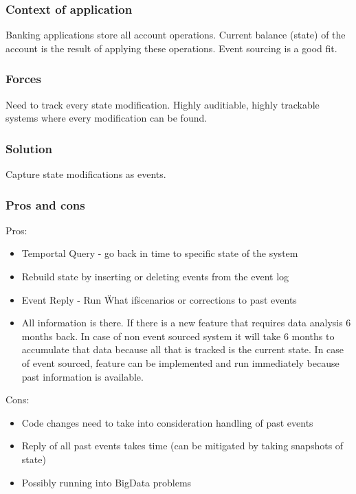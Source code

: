 \documentclass[12pt, a4paper]{article}
\begin{document}
\subsubsection{Context of application}
Banking applications store all account operations. Current balance (state) of the account is the result of applying these operations. Event sourcing is a good fit.

\subsubsection{Forces}
Need to track every state modification. Highly auditiable, highly trackable systems where every modification can be found.

\subsubsection{Solution}
Capture state modifications as events.

\subsubsection{Pros and cons}

Pros:
\begin{itemize}
  \item Temportal Query - go back in time to specific state of the system
  \item Rebuild state by inserting or deleting events from the event log
  \item Event Reply - Run \"What if\" scenarios or corrections to past events
  \item All information is there. If there is a new feature that requires data analysis 6 months back. In case of non event sourced system it will take 6 months to accumulate that data because all that is tracked is the current state. In case of event sourced, feature can be implemented and run immediately because past information is available.
\end{itemize}

Cons:
\begin{itemize}
  \item Code changes need to take into consideration handling of past events
  \item Reply of all past events takes time (can be mitigated by taking snapshots of state)
  \item Possibly running into BigData problems
\end{itemize}
\end{document}
